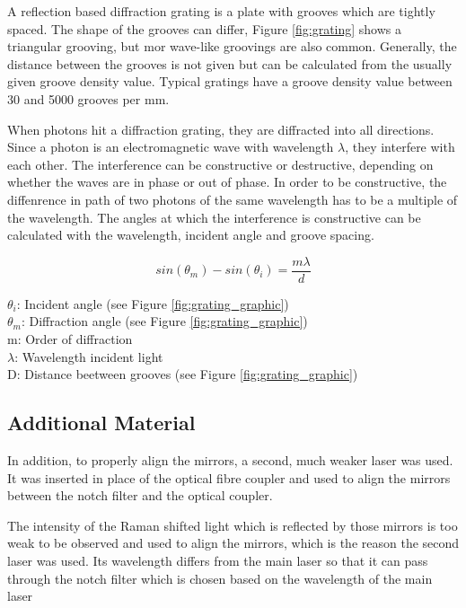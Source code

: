 \bigskip

A reflection based diffraction grating is a plate with grooves which are tightly spaced. The shape of the grooves can differ, Figure \ref{fig:grating} shows a triangular grooving, but mor wave-like groovings are also common. Generally, the distance between the grooves is not given but can be calculated from the usually given groove density value. Typical gratings have a groove density value between 30 and 5000 grooves per mm.

\bigskip


When photons hit a diffraction grating, they are diffracted into all directions. Since a photon is an electromagnetic wave with wavelength \(\lambda\), they interfere with each other. The interference can be constructive or destructive, depending on whether the waves are in phase or out of phase. In order to be constructive, the diffenrence in path of two photons of the same wavelength has to be a multiple of the wavelength. The angles at which the interference is constructive can be calculated with the wavelength, incident angle and groove spacing.


\begin{equation}
     sin(\theta_m)-sin(\theta_i)=\frac{m \lambda}{d}
 \end{equation}

\(\theta_i\): Incident angle (see Figure \ref{fig:grating_graphic})\\
\(\theta_m\): Diffraction angle (see Figure \ref{fig:grating_graphic})\\
m: Order of diffraction\\
\(\lambda\): Wavelength incident light\\
D: Distance beetween grooves (see Figure \ref{fig:grating_graphic})

\newpage

\subsection{Additional Material}

In addition, to properly align the mirrors, a second, much weaker laser was used. It was inserted in place of the optical fibre coupler and used to align the mirrors between the notch filter and the optical coupler. 

\bigskip

The intensity of the Raman shifted light which is reflected by those mirrors is too weak to be observed and used to align the mirrors, which is the reason the second laser was used. Its wavelength differs from the main laser so that it can pass through the notch filter which is chosen based on the wavelength of the main laser
\bigskip

